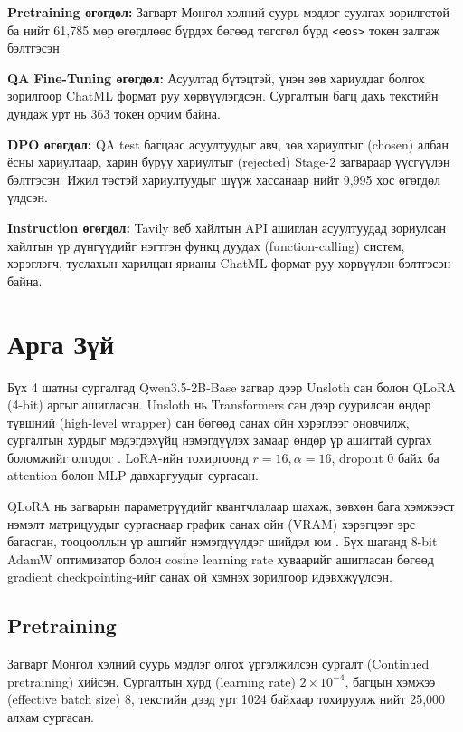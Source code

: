 \documentclass[a4paper,10pt,twocolumn]{article}
\begin{document}
	\textbf{Pretraining өгөгдөл:} Загварт Монгол хэлний суурь мэдлэг суулгах зорилготой ба нийт 61,785 мөр өгөгдлөөс бүрдэх бөгөөд төгсгөл бүрд \texttt{<eos>} токен залгаж бэлтгэсэн.
	
	\textbf{QA Fine-Tuning өгөгдөл:} Асуултад бүтэцтэй, үнэн зөв хариулдаг болгох зорилгоор ChatML формат руу хөрвүүлэгдсэн. Сургалтын багц дахь текстийн дундаж урт нь 363 токен орчим байна.
	
	\textbf{DPO өгөгдөл:} QA test багцаас асуултуудыг авч, зөв хариултыг (chosen) албан ёсны хариултаар, харин буруу хариултыг (rejected) Stage-2 загвараар үүсгүүлэн бэлтгэсэн. Ижил төстэй хариултуудыг шүүж хассанаар нийт 9,995 хос өгөгдөл үлдсэн.
	
	\textbf{Instruction өгөгдөл:} Tavily веб хайлтын API ашиглан асуултуудад зориулсан хайлтын үр дүнгүүдийг нэгтгэн функц дуудах (function-calling) систем, хэрэглэгч, туслахын харилцан ярианы ChatML формат руу хөрвүүлэн бэлтгэсэн байна.
	
	\section{Арга Зүй}
	
	Бүх 4 шатны сургалтад Qwen3.5-2B-Base загвар дээр Unsloth сан \cite{unsloth} болон QLoRA (4-bit) аргыг \cite{qlora} ашигласан. Unsloth нь Transformers сан дээр суурилсан өндөр түвшний (high-level wrapper) сан бөгөөд санах ойн хэрэглээг оновчилж, сургалтын хурдыг мэдэгдэхүйц нэмэгдүүлэх замаар өндөр үр ашигтай сургах боломжийг олгодог \cite{unsloth}. LoRA-ийн тохиргоонд $r=16, \alpha=16$, dropout $0$ байх ба attention болон MLP давхаргуудыг сургасан. 
	
	QLoRA нь загварын параметрүүдийг квантчлалаар шахаж, зөвхөн бага хэмжээст нэмэлт матрицуудыг сургаснаар график санах ойн (VRAM) хэрэгцээг эрс багасган, тооцооллын үр ашгийг нэмэгдүүлдэг шийдэл юм \cite{qlora}. Бүх шатанд 8-bit AdamW оптимизатор болон cosine learning rate хуваарийг ашигласан бөгөөд gradient checkpointing-ийг санах ой хэмнэх зорилгоор идэвхжүүлсэн.
	
	\subsection{Pretraining}
	Загварт Монгол хэлний суурь мэдлэг олгох үргэлжилсэн сургалт (Continued pretraining) хийсэн. Сургалтын хурд (learning rate) $2 \times 10^{-4}$, багцын хэмжээ (effective batch size) 8, текстийн дээд урт 1024 байхаар тохируулж нийт 25,000 алхам сургасан. 
	
\end{document}

